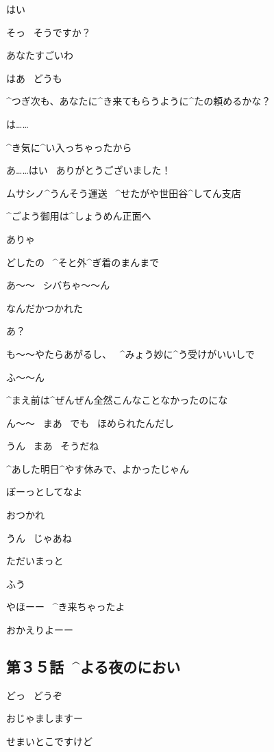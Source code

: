 \Maruko はい

\Kokone そっ
\ そうですか？

\Maruko あなたすごいわ

\Kokone はあ
\ どうも

\page[35]
\Maruko ^{つぎ}{次}も、あなたに^{き}{来}てもらうように^{たの}{頼}めるかな？

\Kokone は……

\Maruko ^{き}{気}に^{い}{入}っちゃったから

\Kokone あ……はい
\ ありがとうございました！

\page[37]
\Sign ムサシノ^{うんそう}{運送}
\ ^{せたがや}{世田谷}^{してん}{支店}

\Sign ^{ごよう}{御用}は^{しょうめん}{正面}へ

\Shiba ありゃ

\Shiba どしたの
\ ^{そと}{外}^{ぎ}{着}のまんまで

\Kokone あ〜〜
\ シバちゃ〜〜ん

\Kokone なんだかつかれた

\Shiba あ？

\page[38]
\Kokone も〜〜やたらあがるし、
\ ^{みょう}{妙}に^{う}{受}けがいいしで

\Shiba ふ〜〜ん

\Kokone ^{まえ}{前}は^{ぜんぜん}{全然}こんなことなかったのにな

\Shiba ん〜〜
\ まあ
\ でも
\ ほめられたんだし

\Kokone うん
\ まあ
\ そうだね

\Shiba ^{あした}{明日}^{やす}{休}みで、よかったじゃん

\Shiba ぼーっとしてなよ

\Shiba おつかれ

\Kokone うん
\ じゃあね

\page[39]
\Kokone ただいまっと

\Kokone ふう

\page[40]
\Alpha やほーー
\ ^{き}{来}ちゃったよ

\Person おかえりよーー


\subsection{第３５話\ ^{よる}{夜}のにおい}

\page[42]
\Kokone どっ
\ どうぞ

\Alpha おじゃましますー

\page[43]
\Kokone せまいとこですけど

